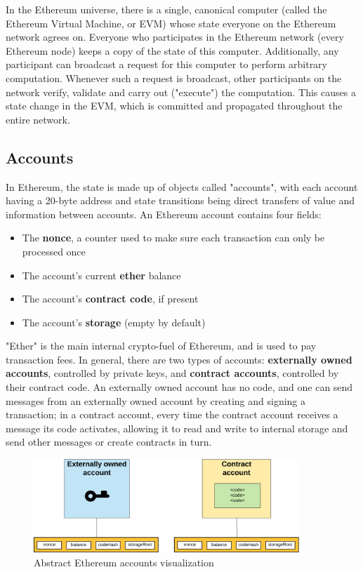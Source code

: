 In the Ethereum universe, there is a single, canonical computer (called the Ethereum Virtual Machine, or EVM) whose state everyone on the Ethereum network agrees on. Everyone who participates in the Ethereum network (every Ethereum node) keeps a copy of the state of this computer. Additionally, any participant can broadcast a request for this computer to perform arbitrary computation. Whenever such a request is broadcast, other participants on the network verify, validate and carry out ("execute") the computation. This causes a state change in the EVM, which is committed and propagated throughout the entire network.\cite{ethereumcommunityEthereumDevelopmentDocumentation}

\subsection{Accounts}
In Ethereum, the state is made up of objects called "accounts", with each account having a 20-byte address and state transitions being direct transfers of value and information between accounts. An Ethereum account contains four fields:

\begin{itemize}
\item The \textbf{nonce}, a counter used to make sure each transaction can only be processed once
\item The account's current \textbf{ether} balance
\item The account's \textbf{contract code}, if present
\item The account's \textbf{storage} (empty by default)
\end{itemize}

"Ether" is the main internal crypto-fuel of Ethereum, and is used to pay transaction fees. In general, there are two types of accounts: \textbf{externally owned accounts}, controlled by private keys, and \textbf{contract accounts}, controlled by their contract code. An externally owned account has no code, and one can send messages from an externally owned account by creating and signing a transaction; in a contract account, every time the contract account receives a message its code activates, allowing it to read and write to internal storage and send other messages or create contracts in turn\cite{buterinvitalikEthereumWhitePaper2013}.\newpage

\begin{figure}[h]
	\centering
		\includegraphics[width=10cm]{images/chapter2/accounts.png}
		\caption{{\footnotesize Abstract Ethereum accounts visualization}}
\end{figure}

